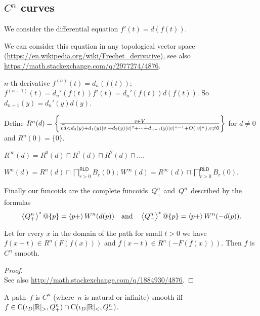 \subsection{$C^n$ curves}

We consider the differential equation $f'(t) = d(f(t))$.

We can consider this equation in any topological vector
space (\url{https://en.wikipedia.org/wiki/Frechet_derivative}), see also
\url{https://math.stackexchange.com/q/2977274/4876}.

$n$-th derivative $f^{(n)}(t)=d_n(f(t))$;
$f^{(n+1)}(t)=d_n'(f(t))f'(t)=d_n'(f(t))d(f(t))$.
So $d_{n+1}(y)=d_n'(y)d(y)$.

Define $R^n(d) = \left\{ \frac{v\in V}{\widehat{vd}<
d_0(y)+d_1(y)|v|+d_2(y)|v|^2+\dots+d_{n-1}(y)|v|^{n-1}+O(|v|^n), v\ne 0}\right\}$ for $d\ne 0$ and $R^n(0) = \{0\}$.

\begin{defn}
$R^\infty(d) = R^0(d)\sqcap R^1(d)\sqcap R^2(d)\sqcap\dots$.
\end{defn}

\begin{defn}
$W^n(d) = R^n(d) \sqcap \bigsqcap^{\mathsf{RLD}}_{r>0}B_r(0)$;
$W^\infty(d) = R^\infty(d) \sqcap \bigsqcap^{\mathsf{RLD}}_{r>0}B_r(0)$.
\end{defn}

Finally our funcoids are the complete funcoids~$Q_+^n$ and~$Q_-^n$ described by the formulas
\[
\left\langle Q_+^n\right\rangle ^{\ast}@\{p\} = \left\langle p+\right\rangle W^n(d(p)) \quad\text{and}\quad \left\langle Q_-^n\right\rangle ^{\ast}@\{p\} = \left\langle p+\right\rangle W^n(-d(p)).
\]


\begin{lem}
Let for every $x$ in the domain of the path for small $t > 0$ we have $f (x + t) \in R^n (F (f (x)))$ and $f (x - t) \in R^n (- F (f (x)))$.
Then $f$ is $C^n$ smooth.
\end{lem}

\begin{proof}
\\
See also \url{http://math.stackexchange.com/q/1884930/4876}.
\end{proof}

\begin{conjecture}
A path~$f$ is $C^n$ (where~$n$ is natural or infinite) smooth iff $f\in\mathrm{C}(\iota_D|\mathbb{R}|_{>},Q_+^n)\cap\mathrm{C}(\iota_D|\mathbb{R}|_{<},Q_-^n)$.
\end{conjecture}


